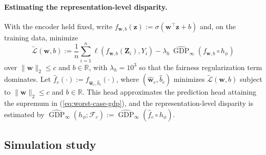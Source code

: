 \documentclass{article} %
\begin{document}
\paragraph{Estimating the representation-level disparity.}  With the encoder held fixed, write $f_{\mathbf{w},b}(\mathbf{z}):=\sigma(\mathbf{w}^\top\mathbf{z}+b)$ and, on the training data, minimize
\begin{equation}
  \widetilde{\mathcal{L}}(\mathbf{w},b)
  :=\frac{1}{n}\sum_{i=1}^n
  \ell\!\left(f_{\mathbf{w},b}(\mathbf{Z}_i),Y_i\right)
  -\lambda_h\,
  \widehat{\operatorname{GDP}}_{\infty}(f_{\mathbf{w},b}\circ h_\phi)
  \label{eq:worst-case-estimate}
\end{equation}
over $\lVert\mathbf{w}\rVert_2\le c$ and $b\in\mathbb{R}$, with $\lambda_h=10^{3}$ so that the fairness regularization term dominates. Let $\hat{f}_c(\cdot):=f_{\hat{\mathbf{w}}_c,\hat{b}_c}(\cdot)$, where $(\hat{\mathbf{w}}_c,\hat{b}_c)$ minimizes $\widetilde{\mathcal{L}}(\mathbf{w},b)$ subject to $\lVert\mathbf{w}\rVert_2\le c$ and $b\in\mathbb{R}$.
  This head approximates the prediction head attaining the supremum in (\ref{eq:worst-case-gdp}), and the representation-level disparity is estimated by $\widehat{\operatorname{GDP}}_{\infty}(h_\phi;\mathcal{F}_c):=\widehat{\operatorname{GDP}}_{\infty}(\hat{f}_c\circ h_\phi)$.

\subsection{Simulation study}
\label{sec:exp-simulation}
\end{document}
